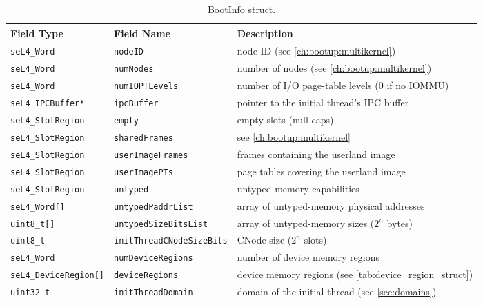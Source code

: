 \begin{table}[htb]
  \begin{center}
    \caption{BootInfo struct.}
    \label{tab:bootinfo_struct}
    \begin{tabularx}{\textwidth}{llX}
      \toprule
      Field Type & Field Name & Description \\
      \midrule
      \texttt{seL4\_Word}           & \texttt{nodeID}                  & node ID (see \autoref{ch:bootup:multikernel}) \\
      \texttt{seL4\_Word}           & \texttt{numNodes}                & number of nodes (see \autoref{ch:bootup:multikernel}) \\
      \texttt{seL4\_Word}           & \texttt{numIOPTLevels}           & number of I/O page-table levels (0 if no IOMMU) \\
      \texttt{seL4\_IPCBuffer*}     & \texttt{ipcBuffer}               & pointer to the initial thread's IPC buffer \\
      \texttt{seL4\_SlotRegion}     & \texttt{empty}                   & empty slots (null caps) \\
      \texttt{seL4\_SlotRegion}     & \texttt{sharedFrames}            & see \autoref{ch:bootup:multikernel} \\
      \texttt{seL4\_SlotRegion}     & \texttt{userImageFrames}         & frames containing the userland image \\
      \texttt{seL4\_SlotRegion}     & \texttt{userImagePTs}            & page tables covering the userland image \\
      \texttt{seL4\_SlotRegion}     & \texttt{untyped}                 & untyped-memory capabilities \\
      \texttt{seL4\_Word[]}         & \texttt{untypedPaddrList}        & array of untyped-memory physical addresses \\
      \texttt{uint8\_t[]}           & \texttt{untypedSizeBitsList}     & array of untyped-memory sizes ($2^n$ bytes) \\
      \texttt{uint8\_t}             & \texttt{initThreadCNodeSizeBits} & CNode size ($2^n$ slots) \\
      \texttt{seL4\_Word}           & \texttt{numDeviceRegions}        & number of device memory regions \\
      \texttt{seL4\_DeviceRegion[]} & \texttt{deviceRegions}           & device memory regions (see \autoref{tab:device_region_struct}) \\
      \texttt{uint32\_t}            & \texttt{initThreadDomain}        & domain of the initial thread (see \autoref{sec:domains}) \\
      \bottomrule
    \end{tabularx}
  \end{center}
\end{table}

